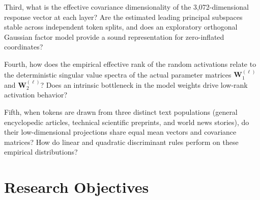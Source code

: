 \documentclass[12pt, a4paper, oneside]{report}
\theoremstyle{definition}
\newcommand{\mat}[1]{\mathbf{#1}}
\begin{document}
Third, what is the effective covariance dimensionality of the 3,072-dimensional response vector at each layer? Are the estimated leading principal subspaces stable across independent token splits, and does an exploratory orthogonal Gaussian factor model provide a sound representation for zero-inflated coordinates?

Fourth, how does the empirical effective rank of the random activations relate to the deterministic singular value spectra of the actual parameter matrices $\mat{W}_1^{(\ell)}$ and $\mat{W}_2^{(\ell)}$? Does an intrinsic bottleneck in the model weights drive low-rank activation behavior?

Fifth, when tokens are drawn from three distinct text populations (general encyclopedic articles, technical scientific preprints, and world news stories), do their low-dimensional projections share equal mean vectors and covariance matrices? How do linear and quadratic discriminant rules perform on these empirical distributions?

\section{Research Objectives}
\end{document}
